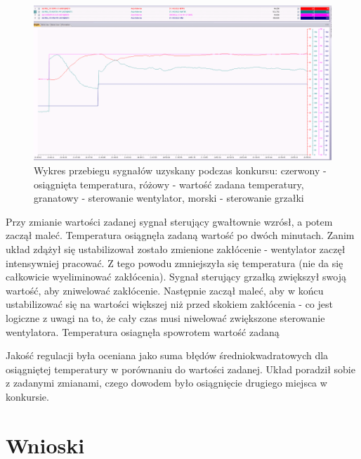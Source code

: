 \documentclass[12pt, a4paper]{article}
\begin{document}
\begin{figure}[H]
	\centering
	\includegraphics[width=0.9\linewidth]{konkurs}
	\caption{Wykres przebiegu sygnałów uzyskany podczas konkursu: czerwony - osiągnięta temperatura, różowy - wartość zadana temperatury, granatowy - sterowanie wentylator, morski - sterowanie  grzałki}
	\label{fig:konkurs}
\end{figure}

Przy zmianie wartości zadanej sygnał sterujący gwałtownie wzrósł, a potem zaczął maleć. Temperatura osiągnęła zadaną wartość po dwóch minutach. Zanim układ zdążył się ustabilizował zostało zmienione zakłócenie - wentylator zaczęł intensywniej pracować. Z tego powodu zmniejszyła się temperatura (nie da się całkowicie wyeliminować zakłócenia). Sygnał sterujący grzałką zwiększył swoją wartość, aby zniwelować zakłócenie. Następnie zaczął maleć, aby w końcu ustabilizować się na wartości większej niż przed skokiem zakłócenia - co jest logiczne z uwagi na to, że cały czas musi niwelować zwiększone sterowanie wentylatora. Temperatura osiagnęła spowrotem wartość zadaną

Jakość regulacji była oceniana jako suma błędów średniokwadratowych dla osiągniętej temperatury w porównaniu do wartości zadanej. Układ poradził sobie z zadanymi zmianami, czego dowodem było osiągnięcie drugiego miejsca w konkursie. 

\section{Wnioski}
\end{document}
